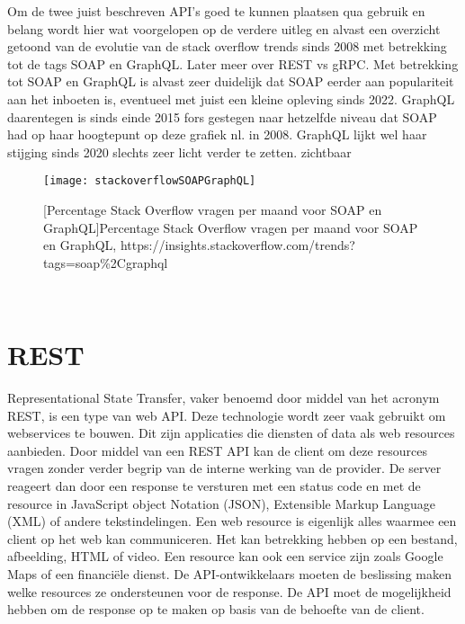 Om de twee juist beschreven API's goed te kunnen plaatsen qua gebruik en belang wordt hier wat voorgelopen op de verdere uitleg en alvast een overzicht getoond van de evolutie van de
stack overflow trends sinds 2008 met betrekking tot de tags SOAP en GraphQL. Later meer over REST vs gRPC. Met betrekking tot SOAP en GraphQL is alvast zeer duidelijk dat SOAP eerder
aan populariteit aan het inboeten is, eventueel met juist een kleine opleving sinds 2022. GraphQL daarentegen is sinds einde 2015 fors gestegen naar hetzelfde niveau dat SOAP had
op haar hoogtepunt op deze grafiek nl. in 2008. GraphQL lijkt wel haar stijging sinds 2020 slechts zeer licht verder te zetten.
zichtbaar
\begin{figure}[ht]
    \centering
    \texttt{[image: stackoverflowSOAPGraphQL]}
    \caption{[Percentage Stack Overflow vragen per maand voor SOAP en GraphQL]Percentage Stack Overflow vragen per maand voor SOAP en GraphQL,\newline
    https://insights.stackoverflow.com/trends?tags=soap\%2Cgraphql}
\end{figure}\\
\nocite{stackoverflowSOAPGraphQL}

\section{REST}

Representational State Transfer, vaker benoemd door middel van het acronym REST, is een type van web API. Deze technologie wordt zeer vaak gebruikt om webservices te bouwen.
Dit zijn applicaties die diensten of data als web resources aanbieden. Door middel van een REST API kan de client om deze resources vragen zonder verder
begrip van de interne werking van de provider. De server reageert dan door een response te versturen met een status code en met de resource in JavaScript object Notation (JSON),
Extensible Markup Language (XML) of andere tekstindelingen. Een web resource is eigenlijk alles waarmee een client op het web kan communiceren.
Het kan betrekking hebben op een bestand, afbeelding, HTML of video. Een resource kan ook een service zijn zoals Google Maps of een financi\"ele dienst.
De API-ontwikkelaars moeten de beslissing maken welke resources ze ondersteunen voor de response.
De API moet de mogelijkheid hebben om de response op te maken op basis van de behoefte van de client.
~\autocite{uptrends}
~\autocite{guru99-webservices}\\

